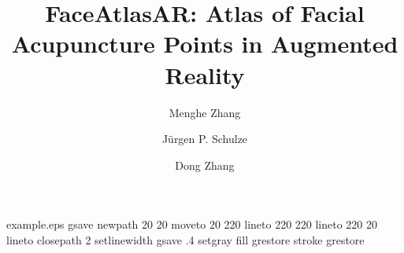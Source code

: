 %
%
%
%
%
\begin{filecontents*}{example.eps}
gsave
newpath
  20 20 moveto
  20 220 lineto
  220 220 lineto
  220 20 lineto
closepath
2 setlinewidth
gsave
  .4 setgray fill
grestore
stroke
grestore
\end{filecontents*}
%
\RequirePackage{fix-cm}
%
\documentclass[twocolumn]{svjour3}          %
%
\smartqed  %
%
\usepackage{graphicx}
%
\usepackage{mathptmx}      %
\usepackage{subcaption}
\captionsetup{compatibility=false}
%
%
%
%


\title{FaceAtlasAR: Atlas of Facial Acupuncture Points in Augmented Reality}


\author{Menghe Zhang \and J\"urgen P. Schulze \and Dong Zhang}



